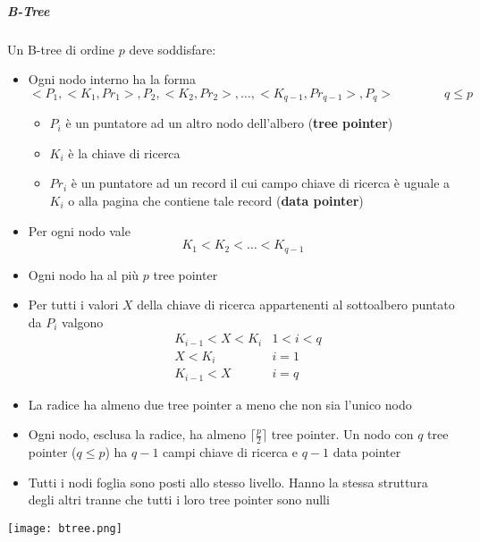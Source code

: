 \subparagraph{B-Tree}
Un B-tree di ordine $p$ deve soddisfare:
\begin{itemize}
	\item Ogni nodo interno ha la forma
	\begin{equation*}
		<P_1, <K_1, Pr_1>, P_2, <K_2, Pr_2>, \ldots, <K_{q-1}, Pr_{q-1} >, P_q > \qquad\qquad q \leq p
	\end{equation*}
	\begin{itemize}
		\item $P_i$ è un puntatore ad un altro nodo dell'albero (\textbf{tree pointer})
		\item $K_i$ è la chiave di ricerca
		\item $Pr_i$ è un puntatore ad un record il cui campo chiave di ricerca è uguale a $K_i$ o alla pagina che contiene tale record (\textbf{data pointer})
	\end{itemize}
	\item Per ogni nodo vale
	\begin{equation*}
		K_1 <K_2 < \ldots < K_{q-1}
	\end{equation*}
	\item Ogni nodo ha al più $p$ tree pointer
	\item Per tutti i valori $X$ della chiave di ricerca appartenenti al sottoalbero puntato da $P_i$ valgono
	\begin{align*}
		& K_{i-1} < X < K_i & 1 < i < q \\
		& X < K_i & i=1 \\
		& K_{i-1} < X & i=q
	\end{align*}
	\item La radice ha almeno due tree pointer a meno che non sia l'unico nodo
	\item Ogni nodo, esclusa la radice, ha almeno $\lceil \frac{p}{2} \rceil$ tree pointer. Un nodo con $q$ tree pointer ($q\leq p$) ha $q-1$ campi chiave di ricerca e $q-1$ data pointer
	\item Tutti i nodi foglia sono posti allo stesso livello. Hanno la stessa struttura degli altri tranne che tutti i loro tree pointer sono nulli
\end{itemize}
\begin{center}
	\texttt{[image: btree.png]}
\end{center}

